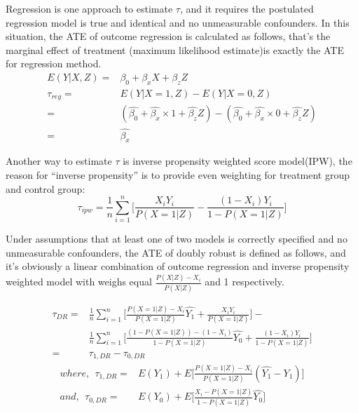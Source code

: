 \documentclass{elegantpaper}
\begin{document}
Regression is one approach to estimate $\tau$, and it requires the postulated regression model is true and identical and no unmeasurable confounders. In this situation, the ATE of outcome regression is calculated  as follows, that's the marginal effect of treatment (maximum likelihood estimate)is exactly the ATE for regression method.
\begin{equation}
\begin{split}
E(Y|X, Z) =&  \beta_0 + \beta_x X + \beta_z Z\\
\tau_{reg} =& E(Y|X=1, Z) - E(Y|X=0, Z)\\
=& (\hat{\beta_0} + \hat{\beta_x} \times 1 + \hat{\beta_z} Z)-
(\hat{\beta_0} + \hat{\beta_x} \times 0 + \hat{\beta_z} Z)\\
=& \hat{\beta_x}
\end{split}
\end{equation}


Another way to estimate $\tau$ is inverse propensity weighted score model(IPW), the reason for “inverse propensity” is to provide even weighting for treatment group and control group:
\begin{equation}
\tau_{ ipw} =\frac{1}{n} \sum_{i=1}^{n} \big[\frac{X_{i} Y_{i}}{P(X=1 | Z)}-\frac{\left(1-X_{i}\right) Y_{i}}{1-P(X=1 | Z)}\big]
\end{equation}

Under assumptions that at least one of two models is correctly specified and no unmeasurable confounders, the ATE of doubly robust is defined as follows, and it's obviously a linear combination of outcome regression and inverse propensity weighted model with weighs equal $\frac{P(X | Z)-X_{i}}{P(X | Z)}$ and 1 respectively.

\begin{equation}
\begin{split}
\tau_{D R}=&\frac{1}{n} \sum_{i=1}^{n} \big[ \frac{P(X=1 | Z)-X_{i}}{P(X=1 | Z)}\widehat{Y_1}+\frac{X_{i} Y_{i}}{P(X=1 | Z)}\big] - \\
&{\frac{1}{n} \sum_{i=1}^{n} \big[ \frac{(1-P(X=1 | Z))-(1-X_{i})}{1-P(X=1 | Z)}\widehat{Y_0}+\frac{\left(1-X_{i}\right) Y_{i}}{1-P(X=1 | Z)}}\big]\\
=&\tau_{1,D R} - \tau_{0,D R}
\end{split}
\end{equation}
\begin{equation}
\begin{split}
where,\ \ \tau_{1,D R} =&
E(Y_1) + E\big[ \frac{P(X=1 | Z)-X_{i}}{P(X=1 | Z)}(\widehat{Y_1}-Y_1)\big]\\
and,\ \ \tau_{0,D R} =& E(Y_0) + E\big[ \frac{X_{i}-P(X=1 | Z)}{1-P(X=1 | Z)}\widehat{Y_0}\big]
\end{split}
\end{equation}
\end{document}
